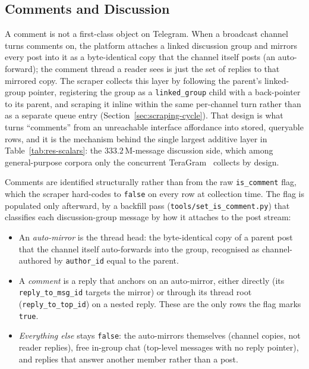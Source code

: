 \subsection{Comments and Discussion}
\label{sec:res-comments}

A comment is not a first-class object on Telegram. When a broadcast channel turns comments on, the platform attaches a linked discussion group and mirrors every post into it as a byte-identical copy that the channel itself posts (an auto-forward); the comment thread a reader sees is just the set of replies to that mirrored copy. The scraper collects this layer by following the parent's linked-group pointer, registering the group as a \texttt{linked\_group} child with a back-pointer to its parent, and scraping it inline within the same per-channel turn rather than as a separate queue entry (Section~\ref{sec:scraping-cycle}). That design is what turns ``comments'' from an unreachable interface affordance into stored, queryable rows, and it is the mechanism behind the single largest additive layer in Table~\ref{tab:res-scalars}: the $333.2$\,M-message discussion side, which among general-purpose corpora only the concurrent TeraGram~\cite{teragram2026} collects by design.

Comments are identified structurally rather than from the raw \texttt{is\_comment} flag, which the scraper hard-codes to \texttt{false} on every row at collection time. The flag is populated only afterward, by a backfill pass (\texttt{tools/set\_is\_comment.py}) that classifies each discussion-group message by how it attaches to the post stream:

\begin{itemize}
\item An \emph{auto-mirror} is the thread head: the byte-identical copy of a parent post that the channel itself auto-forwards into the group, recognised as channel-authored by \texttt{author\_id} equal to the parent.
\item A \emph{comment} is a reply that anchors on an auto-mirror, either directly (its \texttt{reply\_\allowbreak to\_\allowbreak msg\_\allowbreak id} targets the mirror) or through its thread root (\texttt{reply\_\allowbreak to\_\allowbreak top\_\allowbreak id}) on a nested reply. These are the only rows the flag marks \texttt{true}.
\item \emph{Everything else} stays \texttt{false}: the auto-mirrors themselves (channel copies, not reader replies), free in-group chat (top-level messages with no reply pointer), and replies that answer another member rather than a post.
\end{itemize}

